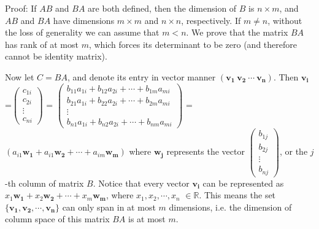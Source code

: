 \documentclass[11pt,a4paper]{article}
\begin{document}
\begin {enumerate}
Proof: If $AB$ and $BA$ are both defined, then the dimension of $B$ is $n\times m$, and $AB$ and $BA$ have dimensions $m\times m$ and $n\times n$, respectively. If $m\ne n$, without the loss of generality we can assume that $m<n$. We prove that the matrix $BA$ has rank of at most $m$, which forces its determinant to be zero (and therefore cannot be identity matrix).

Now let $C=BA$, and denote its entry in vector manner $(\bm{v_1\  v_2\  \cdots\  v_n})$. Then $\bm{v_i}$=$\left(\begin{array}{cccc}c_{1i}\\c_{2i}\\ \vdots\\c_{ni}\end{array}\right)$ =
$\left(\begin{array}{cccc}
b_{11}a_{1i}+b_{12}a_{2i}+\cdots +b_{1m}a_{mi}\\
b_{21}a_{1i}+b_{22}a_{2i}+\cdots +b_{2m}a_{mi}\\ 
\vdots\\
b_{n1}a_{1i}+b_{n2}a_{2i}+\cdots +b_{nm}a_{mi}
\end{array}\right)$
= $(a_{i1}\bm{w_1}+a_{i1}\bm{w_2}+\cdots +a_{im}\bm{w_m})$
where $\bm{w_j}$ represents the vector $\left(\begin{array}{cccc}b_{1j}\\b_{2j}\\ \vdots\\b_{nj}\end{array}\right)$, or the $j$-th column of matrix $B$. Notice that every vector $\bm{v_i}$ can be represented as $x_1\bm{w_1}+x_2\bm{w_2}+\cdots +x_m\bm{w_m}$, where $x_1, x_2, \cdots , x_n$ $\in\mathbb{R}$. This means the set $\{\bm{v_1}, \bm{v_2},\cdots , \bm{v_n}\}$ can only span in at most $m$ dimensions, i.e. the dimension of column space of this matrix $BA$ is at most $m$.


\end{enumerate}
\end{document}
